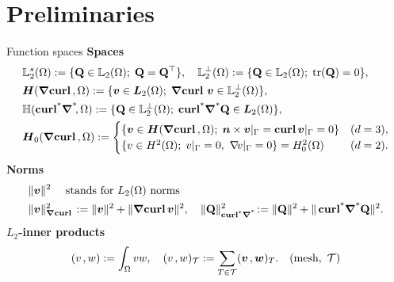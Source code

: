 \documentclass[10pt, compress]{beamer}
\begin{document}
\section{Preliminaries}
\begin{frame}{Function spaces}
\textbf{Spaces}
\begin{align*}
    &\LL_2^s(\Omega):=\{\QQ\in\LL_2(\Omega);\; \QQ=\QQ^\top\},\quad
   \LL_2^\perp(\Omega):=\{\QQ\in\LL_2(\Omega);\; \mathrm{tr}(\QQ)=0\}, \\
    &\HGradCurl{\Omega}:=\{\bv\in\bL_2(\Omega);\; \GCurl\bv\in\LL^\perp_2(\Omega)\},\\
    &\HGradCurla{\Omega}:= \{\QQ\in\LL_2^\perp(\Omega);\; \GCurla\QQ\in\bL_2(\Omega)\},
   \\
   &\HGradCurlz{\Omega} :=
   \begin{cases}
    \{\bv\in \HGradCurl{\Omega};\; \nn\times\bv|_{\Gamma}=\Curl\bv|_{\Gamma} = 0\} & (\di=3),\\
      \{v\in H^2(\Omega);\; v|_{\Gamma}=0,\ \grad\!v|_{\Gamma}=0\} = H^2_0(\Omega)   & (\di=2).
   \end{cases}
\end{align*}  
\textbf{Norms}
\begin{align*}
        & \|\bv\|^2 \quad \text{ stands for $L_2(\Omega)$ norms } \\
        &\|\bv\|^2_{\Grad\Curl} := \|\bv\|^2+\|\Grad\Curl \bv\|^2, \quad
        \|\QQ\|^2_{\GCurla} :=\|\QQ\|^2+\|\GCurla \QQ\|^2.
\end{align*}
\textbf{$L_2$-inner products}
\begin{align*}
    \vdual{v}{w}:=\int_{\Omega}vw, \quad \vdual{v}{w}_\cT := \sum_{T \in \cT} \vdual{\bv}{\bw}_{T}. \quad (\text{mesh},~\cT)
\end{align*} 
\end{frame}
\end{document}
